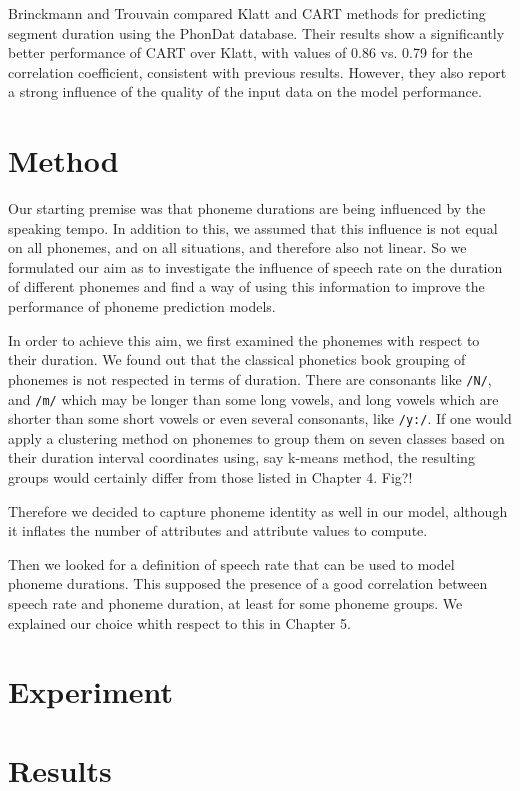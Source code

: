 \documentclass[a4paper]{scrreprt}
\begin{document}
Brinckmann and Trouvain \cite{Brinckmann_2003} compared Klatt and CART methods for predicting segment duration using the PhonDat database. Their results show a significantly better performance of CART over Klatt, with values of 0.86 vs. 0.79 for the correlation coefficient, consistent with previous results. However, they also report a strong influence of  the quality of the input data on the model performance.

\section{Method}
Our starting premise was that phoneme durations are being influenced by the speaking tempo. In addition to this, we assumed that this influence is not equal on all phonemes, and on all situations, and therefore also not linear. So we formulated our aim as to investigate the influence of speech rate on the duration of different phonemes and find a way of using this information to improve the performance of phoneme prediction models. 

In order to achieve this aim, we first examined the phonemes with respect to their duration. We found out that the classical phonetics book grouping of phonemes is not respected in terms of duration. There are consonants like \texttt{/N/}, and \texttt{/m/} which may be longer than some long vowels, and long vowels which are shorter than some short vowels or even several consonants, like \texttt{/y:/}. If one would apply a clustering method on phonemes to group them on seven classes based on their duration interval coordinates using, say k-means method, the resulting groups would certainly differ from those listed in Chapter 4. Fig?! 

Therefore we decided to capture phoneme identity as well in our model, although it inflates the number of attributes and attribute values to compute. 

Then we looked for a definition of speech rate that can be used to model phoneme durations. This supposed the presence of a good correlation between speech rate and phoneme duration, at least for some phoneme groups. We explained our choice whith respect to this in Chapter 5. 

\section{Experiment}

\section{Results}
\end{document}

